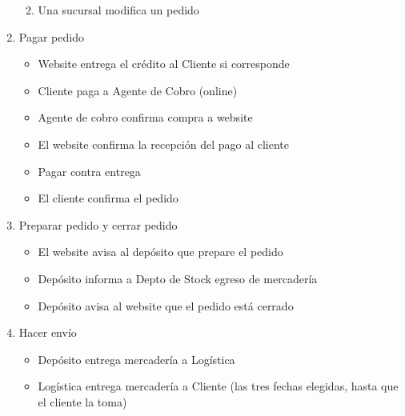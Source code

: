 \begin{enumerate}
\begin{enumerate}
\begin{enumerate}
        \end{enumerate}

        \item Una sucursal modifica un pedido

      \end{enumerate}

      \item Pagar pedido

      \begin{itemize}

        \item Website entrega el crédito al Cliente si corresponde

        \item Cliente paga a Agente de Cobro (online)

        \item Agente de cobro confirma compra a website

        \item El website confirma la recepción del pago al cliente

        \item Pagar contra entrega

        \item El cliente confirma el pedido

      \end{itemize}

      \item Preparar pedido y cerrar pedido

      \begin{itemize}

        \item El website avisa al depósito que prepare el pedido

        \item Depósito informa a Depto de Stock egreso de mercadería

        \item Depósito avisa al website que el pedido está cerrado

      \end{itemize}

      \item Hacer envío

      \begin{itemize}

        \item Depósito entrega mercadería a Logística

        \item Logística entrega mercadería a Cliente (las tres fechas elegidas,
        hasta que el cliente la toma)


\end{itemize}
\end{enumerate}

